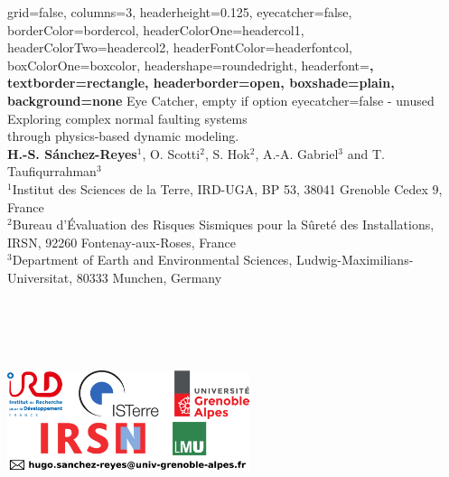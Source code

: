 


	

\color{standardfontcolor}

\begin{poster}{
		grid=false,
		columns=3,
		headerheight=0.125\textheight,
		eyecatcher=false,
        borderColor=bordercol,
		headerColorOne=headercol1,
		headerColorTwo=headercol2,
		headerFontColor=headerfontcol,
		boxColorOne=boxcolor,
		headershape=roundedright,
		headerfont=\sffamily\bfseries\Large,
		textborder=rectangle,
		headerborder=open,
		boxshade=plain,
		background=none
	}
	{
		Eye Catcher, empty if option eyecatcher=false - unused
	}
%
{
	\textsf %
	{\vskip 2.0cm Exploring complex normal faulting systems \\ through physics-based dynamic modeling.}
}
{\sf\vspace{-0.1em}\\
	{\textbf{H.-S. S\'anchez-Reyes$^1$}, O. Scotti$^2$, S. Hok$^2$, A.-A. Gabriel$^3$ and T. Taufiqurrahman$^3$}
	\vspace{0.6em}\\
	\normalsize{$^1$Institut des Sciences de la Terre, IRD-UGA, BP 53, 38041 Grenoble Cedex 9, France \vspace{0.1em}\\
	$^2$Bureau d’Évaluation des Risques Sismiques pour la Sûreté des Installations, IRSN, 92260 Fontenay-aux-Roses, France
	\vspace{0.1em}\\
	$^3$Department of Earth and Environmental Sciences, Ludwig-Maximilians-Universitat, 80333 Munchen, Germany	 	
	} \\ \\ \\ \\ \\ 
}
{ \begin{minipage}{2cm}
  \vskip -0.2cm \hskip -5.2cm \includegraphics[width=7.1cm]{../../logos/logo_poster_2022.png} \\
 \end{minipage}
 }


\end{poster}
